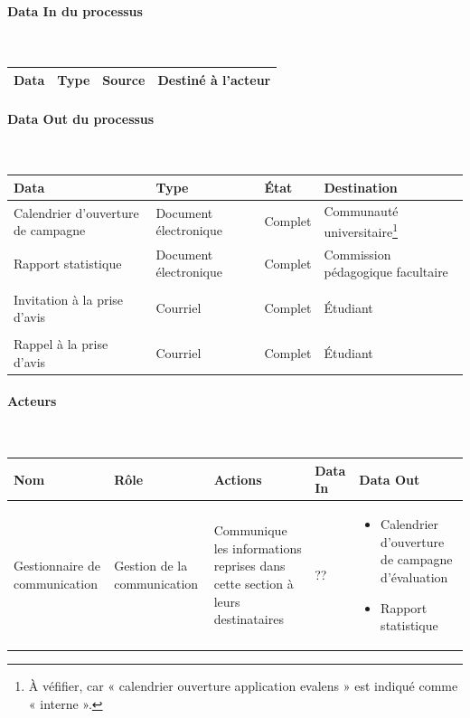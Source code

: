 \documentclass[a4paper,11pt]{report}
\begin{document}
\paragraph{Data In du processus}~\newline{}

\begin{tabularx}{\linewidth}{|X|X|X|X|} \hline
Data & Type & Source & Destiné à l'acteur \\ \hline
\end{tabularx}

\paragraph{Data Out du processus}~\newline{}

\begin{tabularx}{\linewidth}{|X|X|X|X|} \hline
Data & Type & État & Destination \\ \hline
Calendrier d'ouverture de campagne & Document électronique & Complet & Communauté universitaire\footnote{À véfifier, car « calendrier ouverture application evalens » est indiqué comme « interne ».} \\
Rapport statistique & Document électronique & Complet & Commission pédagogique facultaire \\
& & & \\
Invitation à la prise d'avis & Courriel & Complet & Étudiant \\
& & & \\
Rappel à la prise d'avis & Courriel & Complet & Étudiant \\ \hline
\end{tabularx}

\paragraph{Acteurs}~\newline{}

\begin{tabularx}{\linewidth}{|X|X|X|X|X|} \hline
Nom & Rôle & Actions & Data In & Data Out \\ \hline 
Gestionnaire de communication & Gestion de la communication & Communique les informations reprises dans cette section à leurs destinataires & ?? & 
	\begin{itemize} 
		\item Calendrier d'ouverture de campagne d'évaluation
		\item Rapport statistique
	\end{itemize}
\\ \hline
\end{tabularx}
\end{document}
